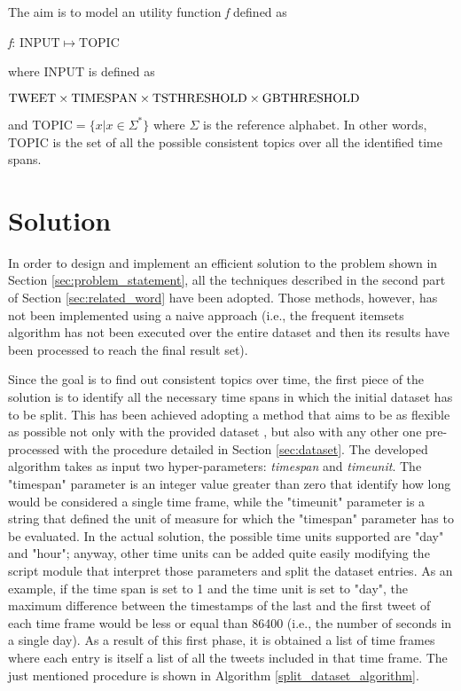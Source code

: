 \noindent The aim is to model an utility function \textit{f} defined as
\begin{center}
	\textit{f}: $\mathrm{INPUT} \mapsto \mathrm{TOPIC}$
\end{center}
where $\mathrm{INPUT}$ is defined as 
\begin{center}
	$\mathrm{TWEET} \times \mathrm{TIMESPAN} \times \mathrm{TS\-THRESHOLD} \times \mathrm{GB\-THRESHOLD}$
\end{center}
 and $\mathrm{TOPIC} = \{x | x \in \Sigma^*\}$ where $\Sigma$ is the reference alphabet. In other words, $\mathrm{TOPIC}$ is the set of all the possible consistent topics over all the identified time spans.

\section{Solution}
\label{sec:solution}
In order to design and implement an efficient solution to the problem shown in Section \ref{sec:problem_statement}, all the techniques described in the second part of Section \ref{sec:related_word} have been adopted. Those methods, however, has not been implemented using a naive approach (i.e., the frequent itemsets algorithm has not been executed over the entire dataset and then its results have been processed to reach the final result set). 

Since the goal is to find out consistent topics over time, the first piece of the solution is to identify all the necessary time spans in which the initial dataset has to be split. This has been achieved adopting a method that aims to be as flexible as possible not only with the provided dataset \cite{covid19-tweets-dataset}, but also with any other one pre-processed with the procedure detailed in Section \ref{sec:dataset}. The developed algorithm takes as input two hyper-parameters: \textit{timespan} and \textit{timeunit}. The "timespan" parameter is an integer value greater than zero that identify how long would be considered a single time frame, while the "timeunit" parameter is a string that defined the unit of measure for which the "timespan" parameter has to be evaluated. In the actual solution, the possible time units supported are "day" and "hour"; anyway, other time units can be added quite easily modifying the script module that interpret those parameters and split the dataset entries. As an example, if the time span is set to 1 and the time unit is set to "day", the maximum difference between the timestamps of the last and the first tweet of each time frame would be less or equal than 86400 (i.e., the number of seconds in a single day). As a result of this first phase, it is obtained a list of time frames where each entry is itself a list of all the tweets included in that time frame. The just mentioned procedure is shown in Algorithm \ref{split_dataset_algorithm}.

